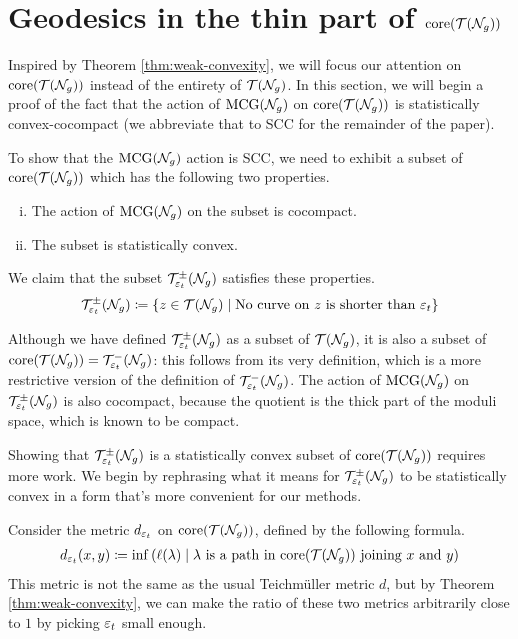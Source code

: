 \section{Geodesics in the thin part of $\mathrm{core}(\mathcal{T}(\mathcal{N}_g))$}
\label{sec:recurr-rand-walks}

Inspired by Theorem \ref{thm:weak-convexity}, we will focus our attention on $\mathrm{core}(\mathcal{T}(\mathcal{N}_g))$ instead of the entirety of $\mathcal{T}(\mathcal{N}_g)$.
In this section, we will begin a proof of the fact that the action of $\mathrm{MCG}(\mathcal{N}_g)$ on $\mathrm{core}(\mathcal{T}(\mathcal{N}_g))$ is statistically convex-cocompact (we abbreviate that to SCC for the remainder of the paper).

To show that the $\mathrm{MCG}(\mathcal{N}_g)$ action is SCC, we need to exhibit a subset of $\mathrm{core}(\mathcal{T}(\mathcal{N}_g))$ which has the following two properties.
\begin{enumerate}[(i)]
\item The action of $\mathrm{MCG}(\mathcal{N}_g)$ on the subset is cocompact.
\item The subset is statistically convex.
\end{enumerate}
We claim that the subset $\mathcal{T}_{\varepsilon_t}^{\pm}(\mathcal{N}_g)$ satisfies these properties.
\begin{align*}
  \mathcal{T}_{\varepsilon_t}^{\pm}(\mathcal{N}_g) \coloneqq \left\{ z \in \mathcal{T}(\mathcal{N}_g) \mid \text{No curve on $z$ is shorter than $\varepsilon_t$} \right\}
\end{align*}

Although we have defined $\mathcal{T}_{\varepsilon_t}^{\pm}(\mathcal{N}_g)$ as a subset of $\mathcal{T}(\mathcal{N}_g)$, it is also a subset of $\mathrm{core}(\mathcal{T}(\mathcal{N}_g)) = \mathcal{T}_{\varepsilon_t}^{-}(\mathcal{N}_g)$: this follows from its very definition, which is a more restrictive version of the definition of $\mathcal{T}_{\varepsilon_t}^{-}(\mathcal{N}_g)$.
The action of $\mathrm{MCG}(\mathcal{N}_g)$ on $\mathcal{T}_{\varepsilon_t}^{\pm}(\mathcal{N}_g)$ is also cocompact, because the quotient is the thick part of the moduli space, which is known to be compact.

Showing that $\mathcal{T}_{\varepsilon_t}^{\pm}(\mathcal{N}_g)$ is a statistically convex subset of $\mathrm{core}(\mathcal{T}(\mathcal{N}_g))$ requires more work.
We begin by rephrasing what it means for $\mathcal{T}_{\varepsilon_t}^{\pm}(\mathcal{N}_g)$ to be statistically convex in a form that's more convenient for our methods.

Consider the metric $d_{\varepsilon_t}$ on $\mathrm{core}(\mathcal{T}(\mathcal{N}_g))$, defined by the following formula.
\begin{align*}
  d_{\varepsilon_t}(x, y) \coloneqq \inf\left( \ell(\lambda) \mid \text{$\lambda$ is a path in $\mathrm{core}(\mathcal{T}(\mathcal{N}_g))$ joining $x$ and $y$} \right)
\end{align*}
This metric is not the same as the usual Teichmüller metric $d$, but by Theorem \ref{thm:weak-convexity}, we can make the ratio of these two metrics arbitrarily close to $1$ by picking $\varepsilon_t$ small enough.

